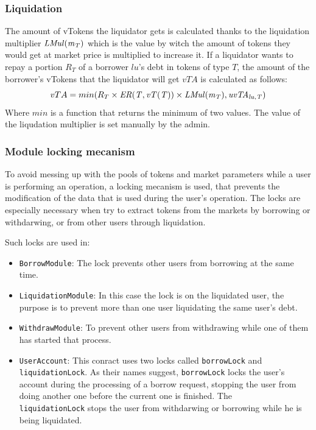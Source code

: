 \subsubsection{Liquidation}

The amount of vTokens the liquidator gets is calculated thanks to the liquidation multiplier $\mathit{LMul(\mathit{m_{T}})}$ which is the value by witch the amount of tokens they would get at market price is multiplied to increase it. If a liquidator wants to repay a portion $R_T$ of a borrower $lu$'s debt in tokens of type $T$, the amount of the borrower's vTokens that the liquidator will get $vTA$ is calculated as follows:
$$
  vTA = min(R_T \times \mathit{ER(T, \mathit{vT(T)})} \times \mathit{LMul(\mathit{m_{T}})}, \mathit{uvTA_{lu, T}})
$$
Where $min$ is a function that returns the minimum of two values. The value of the liqudation multiplier is set manually by the admin.

\subsubsection{Module locking mecanism}

To avoid messing up with the pools of tokens and market parameters while a user is performing an operation, a locking mecanism is used, that prevents the modification of the data that is used during the user's operation. The locks are especially necessary when try to extract tokens from the markets by borrowing or withdarwing, or from other users through liquidation.

Such locks are used in:
\begin{itemize}
  \item \verb|BorrowModule|: The lock prevents other users from borrowing at the same time.
  \item \verb|LiquidationModule|: In this case the lock is on the liquidated user, the purpose is to prevent more than one user liquidating the same user's debt.
  \item \verb|WithdrawModule|: To prevent other users from withdrawing while one of them has started that process.
  \item \verb|UserAccount|: This conract uses two locks called \verb|borrowLock| and \\\verb|liquidationLock|. As their names suggest, \verb|borrowLock| locks the user's account during the processing of a borrow request, stopping the user from doing another one before the current one is finished. The \\\verb|liquidationLock| stops the user from withdarwing or borrowing while he is being liquidated.
\end{itemize}

